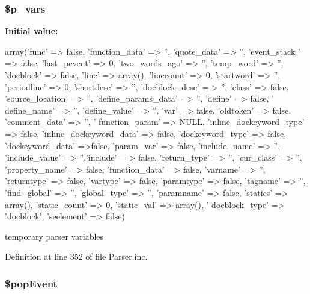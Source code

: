 \hypertarget{class_parser_a24fcec92069c3a367eb43f5c888a0d40}{
\subsubsection[{\$p\-\_\-vars}]{\setlength{\rightskip}{0pt plus 5cm}\$p\-\_\-vars}}\label{class_parser_a24fcec92069c3a367eb43f5c888a0d40}
{\bfseries \-Initial value\-:}
\begin{DoxyCode}
 array('func' => false, 'function_data' => '', 'quote_data' => '', 'event_stack
      ' => false, 'last_pevent' => 0,
                        'two_words_ago' => '', 'temp_word' => '', 'docblock' =>
       false, 'line' => array(), 'linecount' => 0, 'startword' => '',
                        'periodline' => 0, 'shortdesc' => '', 'docblock_desc' =
      > '', 'class' => false, 'source_location' => '',
                        'define_params_data' => '', 'define' => false, '
      define_name' => '', 'define_value' => '', 'var' => false,
                        'oldtoken' => false, 'comment_data' => '', '
      function_param' => NULL, 'inline_dockeyword_type' => false,
                        'inline_dockeyword_data' => false, 'dockeyword_type' =>
       false, 'dockeyword_data' =>false, 'param_var' => false,
                        'include_name' => '', 'include_value' => '','include' =
      > false, 'return_type' => '', 'cur_class' => '', 'property_name' => false,
                        'function_data' => false, 'varname' => '', 'returntype'
       => false, 'vartype' => false, 'paramtype' => false,
                        'tagname' => '', 'find_global' => '', 'global_type' => 
      '', 'paramname' => false, 'statics' => array(),
                        'static_count' => 0, 'static_val' => array(), '
      docblock_type' => 'docblock', 'seelement' => false)
\end{DoxyCode}
temporary parser variables 

\-Definition at line 352 of file \-Parser.\-inc.

\hypertarget{class_parser_a12bfa5a88d0884472fa0aa48d7b48ab7}{
\subsubsection[{\$pop\-Event}]{\setlength{\rightskip}{0pt plus 5cm}\$pop\-Event}}\label{class_parser_a12bfa5a88d0884472fa0aa48d7b48ab7}


